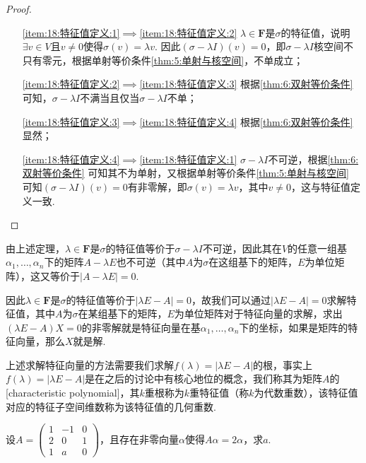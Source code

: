 \begin{proof}
    \begin{itemize}[leftmargin=.8in] %
        \item[\ref*{item:18:特征值定义:1}$\implies$\ref*{item:18:特征值定义:2}] $\lambda\in\mathbf{F}$是$\sigma$的特征值，说明$\exists v\in V$且$v\neq 0$使得$\sigma(v)=\lambda v$. 因此$(\sigma-\lambda I)(v)=0$，即$\sigma-\lambda I$核空间不只有零元，根据单射等价条件\autoref{thm:5:单射与核空间}，不单成立；

        \item[\ref*{item:18:特征值定义:2}$\implies$\ref*{item:18:特征值定义:3}] 根据\autoref{thm:6:双射等价条件} 可知，$\sigma-\lambda I$不满当且仅当$\sigma-\lambda I$不单；

        \item[\ref*{item:18:特征值定义:3}$\implies$\ref*{item:18:特征值定义:4}] 根据\autoref*{thm:6:双射等价条件} 显然；

        \item[\ref*{item:18:特征值定义:4}$\implies$\ref*{item:18:特征值定义:1}] $\sigma-\lambda I$不可逆，根据\autoref*{thm:6:双射等价条件} 可知其不为单射，又根据单射等价条件\autoref*{thm:5:单射与核空间} 可知$(\sigma-\lambda I)(v)=0$有非零解，即$\sigma(v)=\lambda v$，其中$v\neq 0$，这与特征值定义一致.
    \end{itemize}
\end{proof}

由上述定理，$\lambda\in\mathbf{F}$是$\sigma$的特征值等价于$\sigma-\lambda I$不可逆，因此其在$V$的任意一组基$\alpha_1,\ldots,\alpha_n$下的矩阵$A-\lambda E$也不可逆（其中$A$为$\sigma$在这组基下的矩阵，$E$为单位矩阵），这又等价于$|A-\lambda E|=0$.

因此$\lambda\in\mathbf{F}$是$\sigma$的特征值等价于$|\lambda E-A|=0$，故我们可以通过$|\lambda E-A|=0$求解特征值，其中$A$为$\sigma$在某组基下的矩阵，$E$为单位矩阵对于特征向量的求解，求出$(\lambda E-A)X=0$的非零解就是特征向量在基$\alpha_1,\ldots,\alpha_n$下的坐标，如果是矩阵的特征向量，那么$X$就是解.

上述求解特征向量的方法需要我们求解$f(\lambda)=|\lambda E-A|$的根，事实上$f(\lambda)=|\lambda E-A|$是在之后的讨论中有核心地位的概念，我们称其为矩阵$A$的[characteristic polynomial]，其$k$重根称为$k$重特征值（称$k$为代数重数），该特征值对应的特征子空间维数称为该特征值的几何重数.

\begin{example}
    设$A=\begin{pmatrix}
            1 & -1 & 0 \\ 2 & 0 & 1 \\ 1 & a & 0
        \end{pmatrix}$，且存在非零向量$\alpha$使得$A\alpha=2\alpha$，求$a$.
\end{example}


